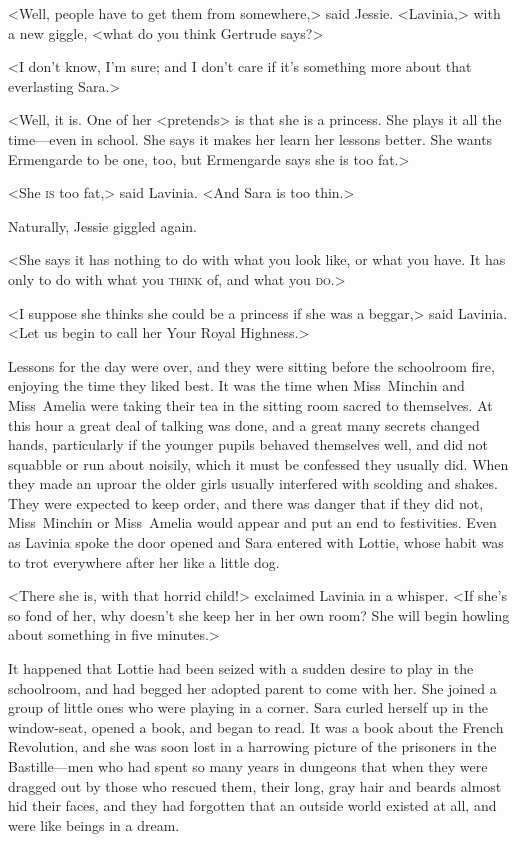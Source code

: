<Well, people have to get them from somewhere,> said Jessie. <Lavinia,> with a new giggle, <what do you think Gertrude says?>

<I don't know, I'm sure; and I don't care if it's something more about that everlasting Sara.>

<Well, it is. One of her <pretends> is that she is a princess. She plays it all the time—even in school. She says it makes her learn her lessons better. She wants Ermengarde to be one, too, but Ermengarde says she is too fat.>

<She \textsc{is} too fat,> said Lavinia. <And Sara is too thin.>

Naturally, Jessie giggled again.

<She says it has nothing to do with what you look like, or what you have. It has only to do with what you \textsc{think} of, and what you \textsc{do}.>

<I suppose she thinks she could be a princess if she was a beggar,> said Lavinia. <Let us begin to call her Your Royal Highness.>

Lessons for the day were over, and they were sitting before the schoolroom fire, enjoying the time they liked best. It was the time when Miss~Minchin and Miss~Amelia were taking their tea in the sitting room sacred to themselves. At this hour a great deal of talking was done, and a great many secrets changed hands, particularly if the younger pupils behaved themselves well, and did not squabble or run about noisily, which it must be confessed they usually did. When they made an uproar the older girls usually interfered with scolding and shakes. They were expected to keep order, and there was danger that if they did not, Miss~Minchin or Miss~Amelia would appear and put an end to festivities. Even as Lavinia spoke the door opened and Sara entered with Lottie, whose habit was to trot everywhere after her like a little dog.

<There she is, with that horrid child!> exclaimed Lavinia in a whisper. <If she's so fond of her, why doesn't she keep her in her own room? She will begin howling about something in five minutes.>

It happened that Lottie had been seized with a sudden desire to play in the schoolroom, and had begged her adopted parent to come with her. She joined a group of little ones who were playing in a corner. Sara curled herself up in the window-seat, opened a book, and began to read. It was a book about the French Revolution, and she was soon lost in a harrowing picture of the prisoners in the Bastille—men who had spent so many years in dungeons that when they were dragged out by those who rescued them, their long, gray hair and beards almost hid their faces, and they had forgotten that an outside world existed at all, and were like beings in a dream.

